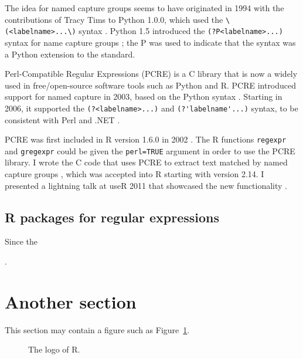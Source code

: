 The idea for named capture groups seems to have originated in 1994
with the contributions of Tracy Tims to Python 1.0.0, which used the
\verb|\(<labelname>...\)| syntax
\citep{Python-1.5.2-Misc-HISTORY}. Python 1.5 introduced the
\verb|(?P<labelname>...)| syntax for name capture groups
\citep{python-1.5-Doc-libre.tex}; the P was used to indicate that the
syntax was a Python extension to the standard.

Perl-Compatible Regular Expressions (PCRE) is a C library that is now
a widely used in free/open-source software tools such as Python and R.
PCRE introduced support for named capture in 2003, based on the Python
syntax \citep{pcre1-changelog.txt}. Starting in 2006, it supported the
\verb|(?<labelname>...)| and \verb|(?'labelname'...)| syntax, to be
consistent with Perl and .NET \citep{pcre1-changelog.txt}.

PCRE was first included in R version 1.6.0 in 2002
\citep{R.NEWS.1.txt}. The R functions \verb|regexpr| and
\verb|gregexpr| could be given the \verb|perl=TRUE| argument in order
to use the PCRE library. I wrote the C code that uses PCRE to extract
text matched by named capture groups \citep{HockingBug2011}, which was
accepted into R starting with version 2.14. I presented a lightning
talk at useR 2011 that showcased the new functionality
\citep{HockingUseR2011}.

\subsection{R packages for regular expressions}

Since the 

\citep{rex}.

\citep{stringr}

\citep{stringi}

\citep{tidyr}

\citep{rematch2}

\citep{re2r}

\citep{namedCapture}

\section{Another section}

This section may contain a figure such as Figure~\ref{figure:rlogo}.

\begin{figure}[htbp]
  \centering
  \caption{The logo of R.}
  \label{figure:rlogo}
\end{figure}

